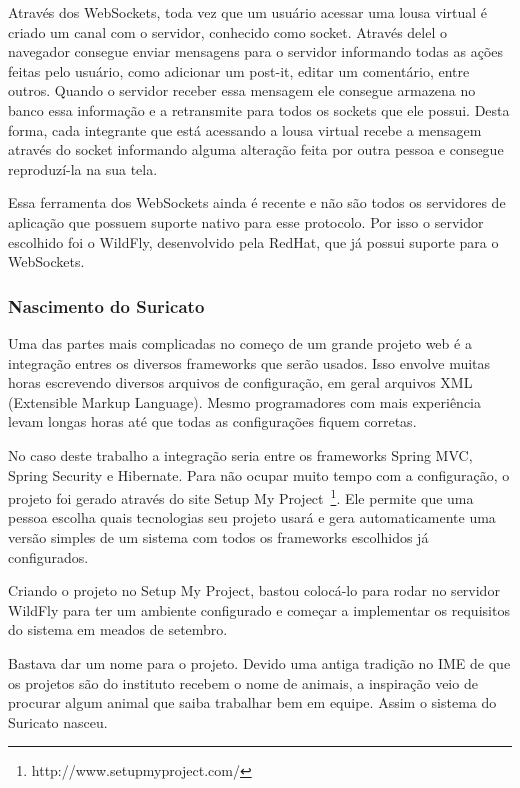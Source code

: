 Através dos WebSockets, toda vez que um usuário acessar uma lousa virtual é criado um canal com o servidor, conhecido como socket. Através delel o navegador consegue enviar mensagens para o servidor informando todas as ações feitas pelo usuário, como adicionar um post-it, editar um comentário, entre outros. Quando o servidor receber essa mensagem ele consegue armazena no banco essa informação e a retransmite para todos os sockets que ele possui. Desta forma, cada integrante que está acessando a lousa virtual recebe a mensagem através do socket informando alguma alteração feita por outra pessoa e consegue reproduzí-la na sua tela.

Essa ferramenta dos WebSockets ainda é recente e não são todos os servidores de aplicação que possuem suporte nativo para esse protocolo. Por isso o servidor escolhido foi o WildFly, desenvolvido pela RedHat, que já possui suporte para o WebSockets.

\subsubsection*{Nascimento do Suricato}

Uma das partes mais complicadas no começo de um grande projeto web é a integração entres os diversos frameworks que serão usados. Isso envolve muitas horas escrevendo diversos arquivos de configuração, em geral arquivos XML (Extensible Markup Language). Mesmo programadores com mais experiência levam longas horas até que todas as configurações fiquem corretas. 
	
No caso deste trabalho a integração seria entre os frameworks Spring MVC, Spring Security e Hibernate. Para não ocupar muito tempo com a configuração, o projeto foi gerado através do site Setup My Project~\footnote{http://www.setupmyproject.com/}. Ele permite que uma pessoa escolha quais tecnologias seu projeto usará e gera automaticamente uma versão simples de um sistema com todos os frameworks escolhidos já configurados.

Criando o projeto no Setup My Project, bastou colocá-lo para rodar no servidor WildFly para ter um ambiente configurado e começar a implementar os requisitos do sistema em meados de setembro.

Bastava dar um nome para o projeto. Devido uma antiga tradição no IME de que os projetos são do instituto recebem o nome de animais, a inspiração veio de procurar algum animal que saiba trabalhar bem em equipe. Assim o sistema do Suricato nasceu.

